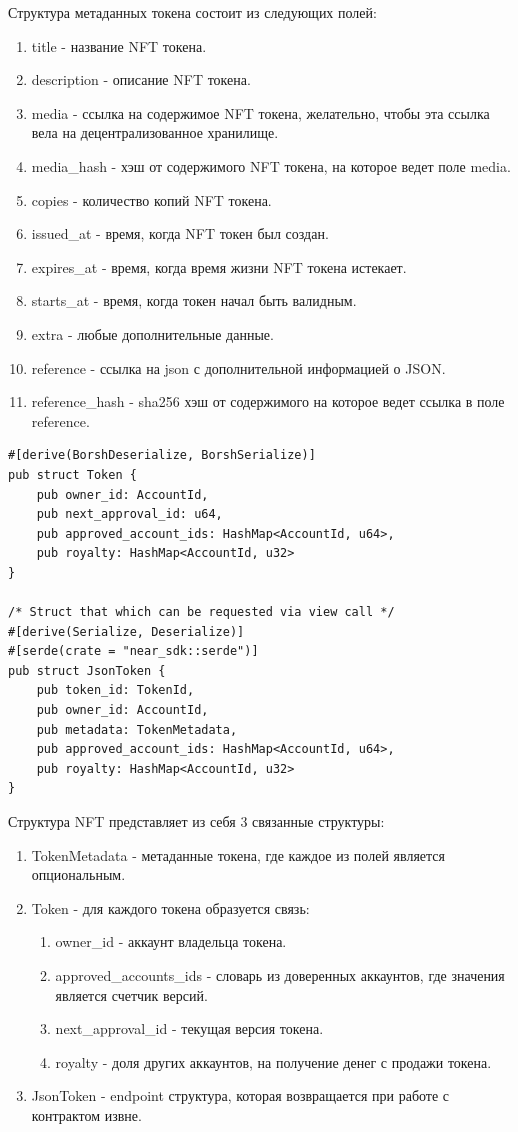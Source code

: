 Структура метаданных токена состоит из следующих полей:
\begin{enumerate}

\item title - название NFT токена.
\item description - описание NFT токена.
\item media - ссылка на содержимое NFT токена, желательно, чтобы эта ссылка вела на децентрализованное хранилище.
\item media\_hash - хэш от содержимого NFT токена, на которое ведет поле media.
\item copies - количество копий NFT токена.
\item issued\_at - время, когда NFT токен был создан.
\item expires\_at - время, когда время жизни NFT токена истекает.
\item starts\_at - время, когда токен начал быть валидным.
\item extra - любые дополнительные данные.
\item reference - ссылка на json с дополнительной информацией о JSON.
\item reference\_hash - sha256 хэш от содержимого на которое ведет ссылка в поле reference.

\end{enumerate}

\begin{verbatim}
#[derive(BorshDeserialize, BorshSerialize)]
pub struct Token {
    pub owner_id: AccountId,
    pub next_approval_id: u64,
    pub approved_account_ids: HashMap<AccountId, u64>,
    pub royalty: HashMap<AccountId, u32>
}

/* Struct that which can be requested via view call */
#[derive(Serialize, Deserialize)]
#[serde(crate = "near_sdk::serde")]
pub struct JsonToken {
    pub token_id: TokenId,
    pub owner_id: AccountId,
    pub metadata: TokenMetadata,
    pub approved_account_ids: HashMap<AccountId, u64>,
    pub royalty: HashMap<AccountId, u32>
}
\end{verbatim}

Структура NFT представляет из себя 3 связанные структуры:
\begin{enumerate}
    \item TokenMetadata - метаданные токена, где каждое из полей является опциональным.
    \item Token - для каждого токена образуется связь:
    \begin{enumerate}
        \item owner\_id - аккаунт владельца токена.
        \item approved\_accounts\_ids - словарь из доверенных аккаунтов, где значения является счетчик версий.
        \item next\_approval\_id - текущая версия токена.
        \item royalty - доля других аккаунтов, на получение денег с продажи токена.
    \end{enumerate}
    \item JsonToken - endpoint структура, которая возвращается при работе с контрактом извне.
\end{enumerate}

